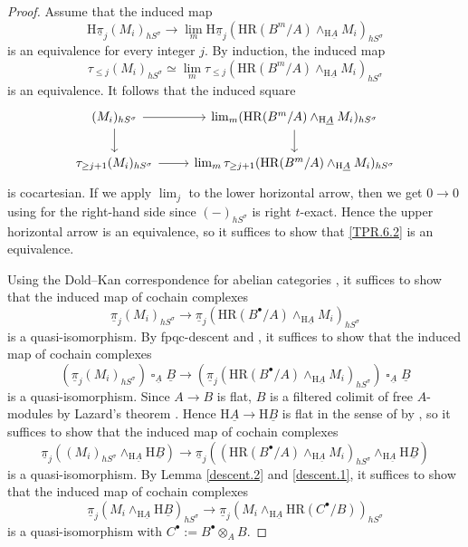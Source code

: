 \documentclass[10pt]{amsart}
\theoremstyle{definition}
\numberwithin{equation}{section}
\newcommand{\rH}{\mathrm{H}}
\newcommand{\ul}{\underline}
\DeclareMathOperator{\sotimes}{\square}
\newcommand{\HR}{\mathrm{HR}}
\begin{document}
{\begin{proof}
Assume that the induced map
\begin{equation}
\label{TPR.6.2}
\rH \ul{\pi}_j (M_i)_{hS^\sigma}
\to
\lim_m
\rH \ul{\pi}_j (\HR(B^m/A)\wedge_{\rH \ul{A}}M_i)_{hS^\sigma}
\end{equation}
is an equivalence for every integer $j$.
By induction, the induced map
\[
\tau_{\leq j} (M_i)_{hS^\sigma}
\simeq
\lim_m \tau_{\leq j} (\HR(B^m/A)\wedge_{\rH \ul{A}}M_i)_{hS^\sigma}
\]
is an equivalence.
It follows that the induced square
\[
\begin{tikzcd}
(M_i)_{hS^\sigma}\ar[d]\ar[r]&
\lim_m (\HR(B^m/A)\wedge_{\rH \ul{A}}M_i)_{hS^\sigma}\ar[d]
\\
\tau_{\geq j+1} (M_i)_{hS^\sigma}\ar[r]&
\lim_m \tau_{\geq j+1} (\HR(B^m/A)\wedge_{\rH \ul{A}}M_i)_{hS^\sigma}
\end{tikzcd}
\]
is cocartesian.
If we apply $\lim_j$ to the lower horizontal arrow,
then we get $0\to 0$ using \cite[Corollary 6.8.1]{BGS20} for the right-hand side since $(-)_{hS^\sigma}$ is right $t$-exact.
Hence the upper horizontal arrow is an equivalence,
so it suffices to show that \eqref{TPR.6.2} is an equivalence.

Using the Dold--Kan correspondence for abelian categories \cite[Tag 019G]{stacks},
it suffices to show that the induced map of cochain complexes
\[
\ul{\pi}_j (M_i)_{hS^\sigma}
\to
\ul{\pi}_j (\HR(B^\bullet/A)\wedge_{\rH \ul{A}} M_i)_{hS^\sigma}
\]
is a quasi-isomorphism.
By fpqc-descent and \cite[Lemma 2.17]{HP},
it suffices to show that the induced map of cochain complexes
\[
(\ul{\pi}_j (M_i)_{hS^\sigma})\sotimes_{\ul{A}}\ul{B}
\to
(\ul{\pi}_j (\HR(B^\bullet/A)\wedge_{\rH \ul{A}}M_i)_{hS^\sigma})\sotimes_{\ul{A}}\ul{B}
\]
is a quasi-isomorphism.
Since $A\to B$ is flat,
$B$ is a filtered colimit of free $A$-modules by Lazard's theorem \cite[Tag 058G]{stacks}.
Hence $\rH \ul{A}\to \rH \ul{B}$ is flat in the sense of \cite[Definition A.5.4]{HP23} by \cite[Proposition A.5.11]{HP23},
so it suffices to show that the induced map of cochain complexes
\[
\ul{\pi}_j ((M_i)_{hS^\sigma}\wedge_{\rH \ul{A}}\rH \ul{B})
\to
\ul{\pi}_j ((\HR(B^\bullet/A)\wedge_{\rH \ul{A}}M_i)_{hS^\sigma}\wedge_{\rH \ul{A}}\rH \ul{B})
\]
is a quasi-isomorphism.
By Lemma \ref{descent.2} and \ref{descent.1},
it suffices to show that the induced map of cochain complexes
\[
\ul{\pi}_j (M_i\wedge_{\rH \ul{A}}\rH \ul{B})_{hS^\sigma}
\to
\ul{\pi}_j (M_i\wedge_{\rH \ul{A}}\HR(C^\bullet/B))_{hS^\sigma}
\]
is a quasi-isomorphism with $C^\bullet:=B^\bullet\otimes_{A}B$.


\end{proof}}
\end{document}
